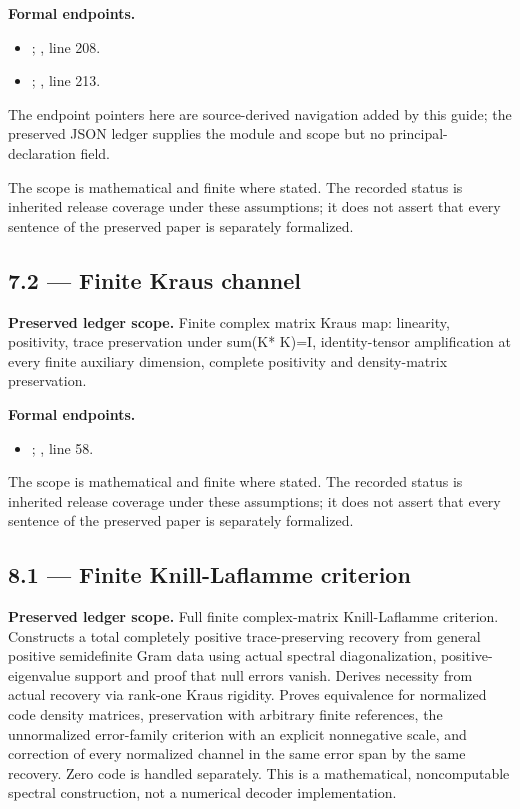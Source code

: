 \textbf{Formal endpoints.}\begin{itemize}
\item {}; , line 208.
\item {}; , line 213.
\end{itemize}
The endpoint pointers here are source-derived navigation added by this guide; the preserved JSON ledger supplies the module and scope but no principal-declaration field.

The scope is mathematical and finite where stated. The recorded status is inherited release coverage under these assumptions; it does not assert that every sentence of the preserved paper is separately formalized.

\subsection{7.2 — Finite Kraus channel}
\label{result:7.2}
\textbf{Preserved ledger scope.} Finite complex matrix Kraus map: linearity, positivity, trace preservation under sum(K* K)=I, identity-tensor amplification at every finite auxiliary dimension, complete positivity and density-matrix preservation.

\textbf{Formal endpoints.}\begin{itemize}
\item {}; , line 58.
\end{itemize}
The scope is mathematical and finite where stated. The recorded status is inherited release coverage under these assumptions; it does not assert that every sentence of the preserved paper is separately formalized.

\subsection{8.1 — Finite Knill-Laflamme criterion}
\label{result:8.1}
\textbf{Preserved ledger scope.} Full finite complex-matrix Knill-Laflamme criterion. Constructs a total completely positive trace-preserving recovery from general positive semidefinite Gram data using actual spectral diagonalization, positive-eigenvalue support and proof that null errors vanish. Derives necessity from actual recovery via rank-one Kraus rigidity. Proves equivalence for normalized code density matrices, preservation with arbitrary finite references, the unnormalized error-family criterion with an explicit nonnegative scale, and correction of every normalized channel in the same error span by the same recovery. Zero code is handled separately. This is a mathematical, noncomputable spectral construction, not a numerical decoder implementation.

